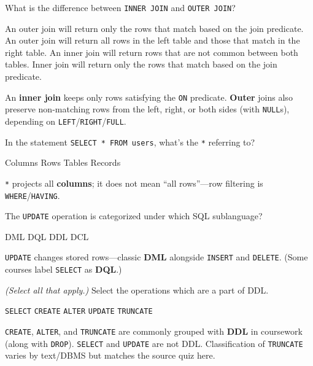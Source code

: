 \question[4]
What is the difference between \lstinline[style=sqlinline]!INNER JOIN! and \lstinline[style=sqlinline]!OUTER JOIN!?
\begin{choices}
  \choice An outer join will return only the rows that match based on the join predicate.
  \choice An outer join will return all rows in the left table and those that match in the right table.
  \choice An inner join will return rows that are not common between both tables.
  \CorrectChoice Inner join will return only the rows that match based on the join predicate.
\end{choices}
\begin{solution}
  An \textbf{inner join} keeps only rows satisfying the \texttt{ON} predicate. \textbf{Outer} joins also preserve non-matching rows from the left, right, or both sides (with \texttt{NULL}s), depending on \texttt{LEFT}/\texttt{RIGHT}/\texttt{FULL}.
\end{solution}

\question[4]
In the statement \lstinline[style=sqlinline]!SELECT * FROM users!, what's the \lstinline[style=sqlinline]!*! referring to?
\begin{choices}
  \CorrectChoice Columns
  \choice Rows
  \choice Tables
  \choice Records
\end{choices}
\begin{solution}
  \texttt{*} projects all \textbf{columns}; it does not mean ``all rows''---row filtering is \texttt{WHERE}/\texttt{HAVING}.
\end{solution}

\question[4]
The \lstinline[style=sqlinline]!UPDATE! operation is categorized under which SQL sublanguage?
\begin{choices}
  \CorrectChoice DML
  \choice DQL
  \choice DDL
  \choice DCL
\end{choices}
\begin{solution}
  \texttt{UPDATE} changes stored rows---classic \textbf{DML} alongside \texttt{INSERT} and \texttt{DELETE}. (Some courses label \texttt{SELECT} as \textbf{DQL}.)
\end{solution}

\newpage

\question[4]
\textit{(Select all that apply.)} Select the operations which are a part of DDL.
\begin{checkboxes}
  \choice \lstinline[style=sqlinline]!SELECT!
  \CorrectChoice \lstinline[style=sqlinline]!CREATE!
  \CorrectChoice \lstinline[style=sqlinline]!ALTER!
  \choice \lstinline[style=sqlinline]!UPDATE!
  \CorrectChoice \lstinline[style=sqlinline]!TRUNCATE!
\end{checkboxes}
\begin{solution}
  \texttt{CREATE}, \texttt{ALTER}, and \texttt{TRUNCATE} are commonly grouped with \textbf{DDL} in coursework (along with \texttt{DROP}). \texttt{SELECT} and \texttt{UPDATE} are not DDL. Classification of \texttt{TRUNCATE} varies by text/DBMS but matches the source quiz here.
\end{solution}
 
